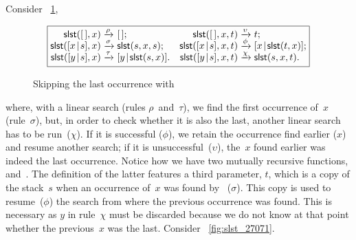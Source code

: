 Consider \fig~\ref{fig:slst},
\begin{figure}[b]
\begin{equation*}
\boxed{%
\begin{array}{@{}r@{\;}l@{\;}lr@{\;}l@{\;}l@{}}
  \fun{slst}(\el,x)           & \xrightarrow{\smash{\rho}} & \el;
& \fun{slst}(\el,x,t)         & \xrightarrow{\smash{\upsilon}} & t;\\
  \fun{slst}(\cons{x}{s},x)   & \xrightarrow{\smash{\sigma}} &
                                           \fun{slst}(s,x,s);
& \fun{slst}(\cons{x}{s},x,t) & \xrightarrow{\smash{\phi}} &
                                           \cons{x}{\fun{slst}(t,x)};\\
  \fun{slst}(\cons{y}{s},x)   & \xrightarrow{\smash{\tau}} &
                                           \cons{y}{\fun{slst}(s,x)}.
& \fun{slst}(\cons{y}{s},x,t) & \xrightarrow{\smash{\chi}} &
                                           \fun{slst}(s,x,t).
\end{array}}
\end{equation*}
\caption{Skipping the last occurrence with 
\label{fig:slst}}
\end{figure}
where, with a linear search (rules
\(\rho\)~and~\(\tau\)), we find the first occurrence of~\(x\)
(rule~\(\sigma\)), but, in order to check whether it is also the last,
another linear search has to be run~(\(\chi\)). If it is successful
(\(\phi\)), we retain the occurrence find earlier (\(x\)) and resume
another search; if it is unsuccessful~(\(\upsilon\)), the~\(x\) found
earlier was indeed the last occurrence.  Notice how we have two
mutually recursive functions, 
and~. The definition of the
latter features a third parameter, \(t\), which is a copy of the
stack~\(s\) when an occurrence of~\(x\) was found
by~ (\(\sigma\)). This copy is
used to resume~(\(\phi\)) the search from where the previous
occurrence was found. This is necessary as \(y\) in rule~\(\chi\) must
be discarded because we do not know at that point whether the
previous~\(x\) was the last. Consider \fig~\vref{fig:slst_27071}.
